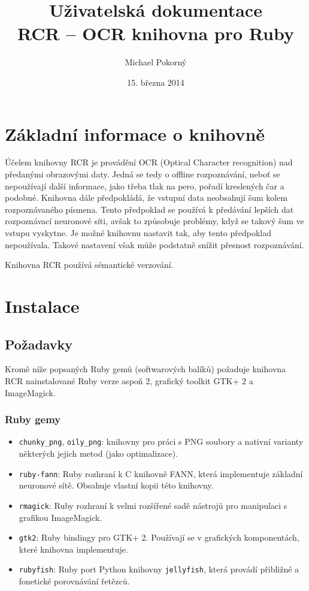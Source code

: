 \documentclass[a4paper]{article}
\def\datum{15. března 2014}
\begin{document}
\title{Uživatelská dokumentace \\ RCR -- OCR knihovna pro Ruby}
\author{Michael Pokorný}
\date{\datum}

\maketitle

\tableofcontents

\section{Základní informace o knihovně}
Účelem knihovny RCR je provádění OCR (Optical Character recognition) nad
předanými obrazovými daty. Jedná se tedy o offline rozpoznávání, neboť
se nepoužívají další informace, jako třeba tlak na pero, pořadí kreslených
čar a podobné. Knihovna dále předpokládá, že vstupní data neobsahují
šum kolem rozpoznávaného písmena. Tento předpoklad se používá k předávání
lepších dat rozpoznávací neuronové síti, avšak to způsobuje problémy,
když se takový šum ve vstupu vyskytne. Je možné knihovnu nastavit tak, aby
tento předpoklad nepoužívala. Takové nastavení však může podstatně snížit
přesnost rozpoznávání.

Knihovna RCR používá sémantické verzování.

\section{Instalace}
\subsection{Požadavky}
Kromě níže popsaných Ruby gemů (softwarových balíků) požaduje knihovna RCR
nainstalované Ruby verze aspoň 2, grafický toolkit GTK+ 2 a ImageMagick.

\subsubsection{Ruby gemy}
\begin{itemize}
\item \texttt{chunky\_png}, \texttt{oily\_png}: knihovny pro práci s PNG soubory
	a nativní varianty některých jejich metod (jako optimalizace).
\item \texttt{ruby-fann}: Ruby rozhraní k C knihovně FANN, která implementuje
	základní neuronové sítě. Obsahuje vlastní kopii této knihovny.
\item \texttt{rmagick}: Ruby rozhraní k velmi rozšířené sadě nástrojů pro
	manipulaci s grafikou ImageMagick.
\item \texttt{gtk2}: Ruby bindingy pro GTK+ 2. Používají se v grafických
	komponentách, které knihovna implementuje.
\item \texttt{rubyfish}: Ruby port Python knihovny \texttt{jellyfish}, která
	provádí přibližné a fonetické porovnávání řetězců.
\end{itemize}
\end{document}
